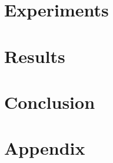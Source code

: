 \documentclass[runningheads,a4paper]{llncs}
\begin{document}
\section{Experiments}
\label{sec:experiments}


\section{Results}
\label{sec:results}


\section{Conclusion}
\label{sec:conclusion}


\section{Appendix}
\label{sec:appendix}



%
%
%
%

 
\end{document}
